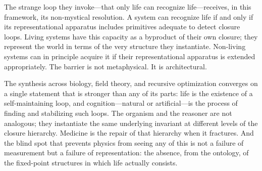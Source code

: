 \documentclass[11pt, a4paper]{article}
\theoremstyle{plain}
\theoremstyle{definition}
\theoremstyle{remark}
\begin{document}
The strange loop they invoke---that only life can recognize life---receives, in this framework, its non-mystical resolution. A system can recognize life if and only if its representational apparatus includes primitives adequate to detect closure loops. Living systems have this capacity as a byproduct of their own closure; they represent the world in terms of the very structure they instantiate. Non-living systems can in principle acquire it if their representational apparatus is extended appropriately. The barrier is not metaphysical. It is architectural.

The synthesis across biology, field theory, and recursive optimization converges on a single statement that is stronger than any of its parts: life is the existence of a self-maintaining loop, and cognition---natural or artificial---is the process of finding and stabilizing such loops. The organism and the reasoner are not analogous; they instantiate the same underlying invariant at different levels of the closure hierarchy. Medicine is the repair of that hierarchy when it fractures. And the blind spot that prevents physics from seeing any of this is not a failure of measurement but a failure of representation: the absence, from the ontology, of the fixed-point structures in which life actually consists.
\end{document}

